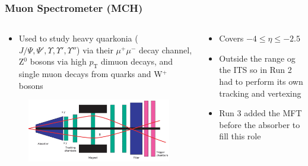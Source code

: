 \documentclass[11pt]{beamer}
\begin{document}
\begin{frame}
    \frametitle{Muon Spectrometer (MCH)}

    \begin{columns}[c]
        \begin{column}{0.6\textwidth}
            \begin{itemize}
                \item Used to study heavy quarkonia ($J/\Psi,\Psi',\Upsilon,\Upsilon',\Upsilon''$) via their $\mu^+\mu^-$ decay channel, Z$^0$ bosons via high $p_\mathrm{T}$ dimuon decays, and single muon decays from quarks and W$^+$ bosons
            \end{itemize}
            \begin{figure}[h]
                \begin{center}
                    \includegraphics[width=\textwidth]{Figs/MCH_schematic.png}
                \end{center}
            \end{figure}
        \end{column}

        \begin{column}{0.4\textwidth}
            \begin{itemize}
                \item Covers $-4\leq\eta\leq -2.5$
                \item Outside the range og the ITS so in Run 2 had to perform its own tracking and vertexing
                \item Run 3 added the MFT before the absorber to fill this role
            \end{itemize}
        \end{column}
    \end{columns}

\end{frame}
\end{document}
